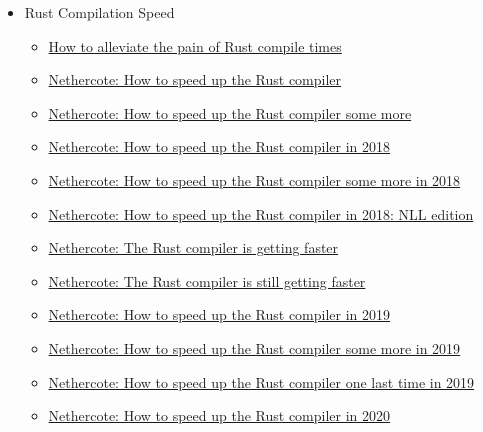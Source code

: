 \documentclass[12pt, a4paper]{report}
\begin{document}
\begin{itemize}[noitemsep]
  \item Rust Compilation Speed
    \begin{itemize}[noitemsep]
    \item \href{https://vfoley.xyz/rust-compile-speed-tips/}{\Square How to alleviate the pain of Rust compile times}
    \item \href{https://blog.mozilla.org/nnethercote/2016/10/14/how-to-speed-up-the-rust-compiler/}{\Square Nethercote: How to speed up the Rust compiler}
    \item \href{https://blog.mozilla.org/nnethercote/2016/11/23/how-to-speed-up-the-rust-compiler-some-more/}{\Square Nethercote: How to speed up the Rust compiler some more}
    \item \href{https://blog.mozilla.org/nnethercote/2018/04/30/how-to-speed-up-the-rust-compiler-in-2018/}{\Square Nethercote: How to speed up the Rust compiler in 2018}
    \item \href{https://blog.mozilla.org/nnethercote/2018/06/05/how-to-speed-up-the-rust-compiler-some-more-in-2018/}{\Square Nethercote: How to speed up the Rust compiler some more in 2018}
    \item \href{https://blog.mozilla.org/nnethercote/2018/11/06/how-to-speed-up-the-rust-compiler-in-2018-nll-edition/}{\Square Nethercote: How to speed up the Rust compiler in 2018: NLL edition}
    \item \href{https://blog.mozilla.org/nnethercote/2018/05/17/the-rust-compiler-is-getting-faster/}{\Square Nethercote: The Rust compiler is getting faster}
    \item \href{https://blog.mozilla.org/nnethercote/2019/07/25/the-rust-compiler-is-still-getting-faster/}{\Square Nethercote: The Rust compiler is still getting faster}
    \item \href{https://blog.mozilla.org/nnethercote/2019/07/17/how-to-speed-up-the-rust-compiler-in-2019/}{\Square Nethercote: How to speed up the Rust compiler in 2019}
    \item \href{https://blog.mozilla.org/nnethercote/2019/10/11/how-to-speed-up-the-rust-compiler-some-more-in-2019/}{\Square Nethercote: How to speed up the Rust compiler some more in 2019}
    \item \href{https://blog.mozilla.org/nnethercote/2019/12/11/how-to-speed-up-the-rust-compiler-one-last-time-in-2019/}{\Square Nethercote: How to speed up the Rust compiler one last time in 2019}
    \item \href{https://blog.mozilla.org/nnethercote/2020/04/24/how-to-speed-up-the-rust-compiler-in-2020/}{\Square Nethercote: How to speed up the Rust compiler in 2020}

\end{itemize}
\end{itemize}
\end{document}
